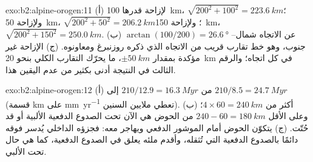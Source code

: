 \begin{solution}{exo:b2:alpine-orogen:11}
(أ) لإزاحة قدرها \qty{100}{km}، $\sqrt{200^2 + 100^2} = \qty{223.6}{km}$؛ ولإزاحة
\qty{50}{km}، $\sqrt{200^2 + 50^2} = \qty{206.2}{km}$؛ ولإزاحة \qty{150}{km}،
$\sqrt{200^2 + 150^2} = \qty{250.0}{km}$. (ب) $\arctan(100/200) = \qty{26.6}{\degree}$ عن
الاتجاه شمال--جنوب، وهو خط تقارب قريب من الاتجاه  الذي ذكره روزنبرغ
ومعاونوه. (ج) الإزاحة غير مؤكدة بمقدار $\pm\qty{50}{km}$، ما يحرّك التقارب الكلي
بنحو \qty{20}{km} في كل اتجاه؛ والرقم الثالث في النتيجة أدنى بكثير من
عدم اليقين هذا.
\end{solution}

\begin{solution}{exo:b2:alpine-orogen:12}
(أ) من $210/12.9 = \qty{16.3}{Myr}$ إلى $210/8.5 = \qty{24.7}{Myr}$ (قسمة \unit{km} على
\unit{mm.yr^{-1}} تعطي ملايين السنين). (ب) أكثر من $4\times60 = \qty{240}{km}$؛
وعلى الأقل $240 - 60 = \qty{180}{km}$ من الحوض هي الآن تحت الصدوع الدفعية الألبية أو قد
حُتّت. (ج) يتكوّن الحوض أمام الموشور الدفعي ويهاجر معه: فجزؤه
الداخلي يُدسر فوقه دائمًا بالصدوع الدفعية التي تُثقله، وأقدم ملئه يعلق
في الصدوع الدفعية، كما هي حال  تحت الألبي.
\end{solution}

